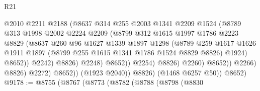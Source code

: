 \begin{lexlean}{R21}
\begin{coremodule}
                                      @2010
                                      @2211
                                      @2188
                                      (@8637
                                        @314
                                        @255
                                        @2003
                                        @1341
                                        @2209
                                        @1524
                                        (@8789
                                          @313
                                          @1998
                                          @2002
                                          @2224
                                          @2209
                                          (@8799
                                            @312
                                            @1615
                                            @1997
                                            @1786
                                            @2223
                                            @8829
                                            (@8637
                                              @260
                                              @96
                                              @1627
                                              @1339
                                              @1897
                                              @1298
                                              (@8789
                                                @259
                                                @1617
                                                @1626
                                                @1911
                                                @1897
                                                (@8799 @255 @1615 @1341 @1786 @1524 @8829 @8826)
                                                @1924)
                                              @8652))
                                          @2242)
                                        @8826)
                                      @2248)
                                    @8652))
                                @2254)
                              @8826)
                            @2260)
                          @8652))
                      @2266)
                    @8826)
                  @2272)
                @8652))
            (@1923 @2040))
          @8826)
        (@1468 @6257 @50))
      @8652)
@9178 := @8755
    (@8767
      (@8773
        (@8782
          (@8788
            (@8798
              (@8830

\end{coremodule}
\end{lexlean}
